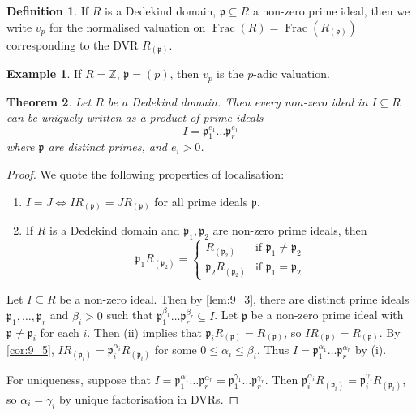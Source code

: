 \documentclass[11pt]{article}
\theoremstyle{definition}
\newtheorem{definition}{Definition}[subsection]
\newtheorem*{example}{Example}
\theoremstyle{plain}
\newtheorem{theorem}[definition]{Theorem}
\theoremstyle{remark}
\DeclareMathOperator{\Frac}{Frac}
\newcommand{\ZZ}{\mathbb{Z}}
\newcommand{\fp}{\mathfrak{p}}
\begin{document}
\begin{definition}\label{def:9_6}
    If $R$ is a Dedekind domain, $\fp \subseteq R$ a non-zero prime ideal, then we write $v_p$ for the normalised valuation on $\Frac(R) = \Frac(R_{(\fp)})$ corresponding to the DVR $R_{(\fp)}$.
\end{definition}

\begin{example}
    If $R = \ZZ$, $\fp = (p)$, then $v_p$ is the $p$-adic valuation.
\end{example}

\begin{theorem}\label{thm:9_7}
    Let $R$ be a Dedekind domain. Then every non-zero ideal in $I \subseteq R$ can be uniquely written as a product of prime ideals
    \begin{equation*}
        I = \fp_1^{e_1} \ldots \fp_r^{e_1}
    \end{equation*}
    where $\fp$ are distinct primes, and $e_i > 0$.
\end{theorem}
\begin{proof}
    We quote the following properties of localisation:
    \begin{enumerate}
        \item $I = J \iff I R_{(\fp)} = J R_{(\fp)}$ for all prime ideals $\fp$.
        \item If $R$ is a Dedekind domain and $\fp_1, \fp_2$ are non-zero prime ideals, then
            \begin{equation*}
                \fp_1 R_{(\fp_2)} =
                \begin{cases}
                    R_{(\fp_2)} &\text{if } \fp_1 \neq \fp_2\\
                    \fp_2 R_{(\fp_2)} &\text{if } \fp_1 = \fp_2
                \end{cases}
            \end{equation*}
    \end{enumerate}

    Let $I \subseteq R$ be a non-zero ideal. Then by \autoref{lem:9_3}, there are distinct prime ideals $\fp_1, \ldots, \fp_r$ and $\beta_i > 0$ such that $\fp_1^{\beta_1} \ldots \fp_r^{\beta_r} \subseteq I$. Let $\fp$ be a non-zero prime ideal with $\fp \neq \fp_i$ for each $i$. Then (ii) implies that $\fp_i R_{(\fp)} = R_{(\fp)}$, so $I R_{(\fp)} = R_{(\fp)}$. By \autoref{cor:9_5}, $I R_{(\fp_i)} = \fp_i^{\alpha_i} R_{(\fp_i)}$ for some $0 \le \alpha_i \le \beta_i$. Thus $I = \fp_1^{\alpha_1} \ldots \fp_r^{\alpha_r}$ by (i).

    For uniqueness, suppose that $I = \fp_1^{\alpha_1} \ldots \fp_r^{\alpha_r} = \fp_1^{\gamma_1} \ldots \fp_r^{\gamma_r}$. Then $\fp_i^{\alpha_i} R_{(\fp_i)} = \fp_i^{\gamma_i} R_{(\fp_i)}$, so $\alpha_i = \gamma_i$ by unique factorisation in DVRs.
\end{proof}
\end{document}
